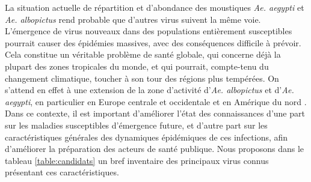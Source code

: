 La situation actuelle de répartition et d'abondance des moustiques {\em Ae. aegypti} et {\em Ae. albopictus} rend probable que d'autres virus suivent la même voie.
L'émergence de virus nouveaux dans des populations entièrement susceptibles pourrait causer des épidémies massives, avec des conséquences difficile à prévoir.
Cela constitue un véritable problème de santé globale, qui concerne déjà la plupart des zones tropicales du monde, et qui pourrait, compte-tenu du changement climatique, toucher à son tour des régions plus tempérées. 
On s'attend en effet à une extension de la zone d'activité d'{\em Ae. albopictus} et d'{\em Ae. aegypti}, en particulier en Europe centrale et occidentale et en Amérique du nord \cite{fischer2011projection,rochlin2013climate,monaghan2018potential}.
Dans ce contexte, il est important d'améliorer l'état des connaissances d'une part sur les maladies susceptibles d'émergence future, et d'autre part sur les caractéristiques générales des dynamiques épidémiques de ces infections, afin d'améliorer la préparation des acteurs de santé publique.
Nous proposons dans le tableau \ref{table:candidats} un bref inventaire des principaux virus connus présentant ces caractéristiques.


%
%
%


